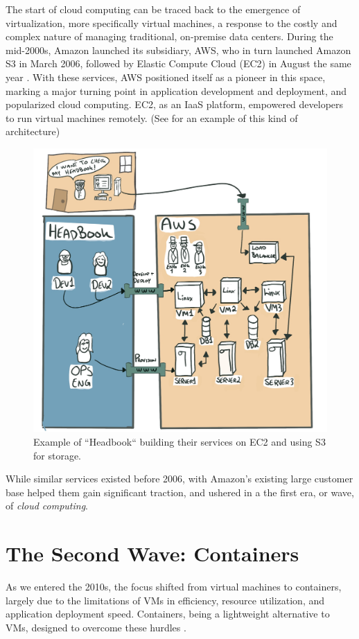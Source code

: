 \documentclass[
  table]{report}
\begin{document}
The start of cloud computing can be traced back to the emergence of
virtualization, more specifically virtual machines, a response to the
costly and complex nature of managing traditional, on-premise data
centers. During the mid-2000s, Amazon launched its subsidiary, \ac{AWS},
who in turn launched Amazon S3 in March 2006, followed by Elastic
Compute Cloud (EC2) in August the same year
\citep{barrAmazonEC2Beta2006}. With these services, \ac{AWS} positioned
itself as a pioneer in this space, marking a major turning point in
application development and deployment, and popularized cloud computing.
EC2, as an \ac{IaaS} platform, empowered developers to run virtual
machines remotely. (See  for an example of this kind
of architecture)

\begin{figure}[H]
\centering
  \includegraphics[width=0.7\columnwidth]{assets/aws-wave.jpg}
  \caption{Example of ``Headbook`` building their services on EC2 and using S3
for storage.}
  \label{fig:headbook}
\end{figure}

While similar services existed before 2006, with Amazon's existing large
customer base helped them gain significant traction, and ushered in a
the first era, or wave, of \emph{cloud computing}.

\section{The Second Wave: Containers}
\label{sect:second-wave}

As we entered the 2010s, the focus shifted from virtual machines to
containers, largely due to the limitations of VMs in efficiency,
resource utilization, and application deployment speed. Containers,
being a lightweight alternative to VMs, designed to overcome these
hurdles \citep{bao2016}.
\end{document}
